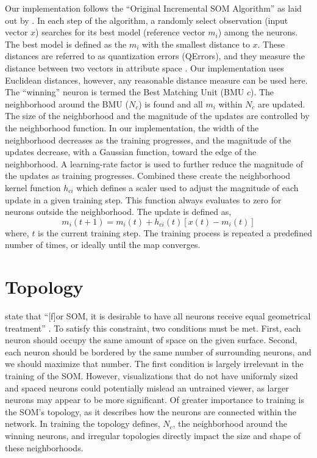 Our implementation follows the ``Original Incremental SOM Algorithm'' as laid
out by \cite{Kohonen2000}.  In each step of the algorithm, a randomly select
observation (input vector $x$) searches for its best model (reference vector
$m_i$) among the neurons.  The best model is defined as the $m_i$ with the
smallest distance to $x$.  These distances are referred to as quantization
errors (QErrors), and they measure the distance between two vectors in
attribute space \citep{Kohonen2000}.  Our implementation uses Euclidean
distances, however, any reasonable distance measure can be used here.  The
``winning'' neuron is termed the Best Matching Unit (BMU $c$).  The
neighborhood around the BMU ($N_c$) is found and all $m_i$ within $N_c$ are
updated.  The size of the neighborhood and the magnitude of the updates are
controlled by the neighborhood function. In our implementation, the width of
the neighborhood decreases as the training progresses, and the magnitude of
the updates decrease, with a Gaussian function, toward the edge of the
neighborhood. A learning-rate factor is used to further reduce the magnitude
of the updates as training progresses.  Combined these create the neighborhood
kernel function $h_{ci}$ which defines a scaler used to adjust the magnitude
of each update in a given training step.  This function always evaluates to
zero for neurons outside the neighborhood.  The update is defined as,
\begin{equation}
  {m_i(t+1)} = m_i(t) +  h_{ci}(t)[x(t) - m_i(t)]
\label{update}
\end{equation}
where, $t$ is the current training step.  The training process is repeated a
predefined number of times, or ideally until the map converges.

\section{Topology}
\citeauthor{wu2006} state that ``[f]or SOM, it is desirable to have all
neurons receive equal geometrical treatment'' \cite[p. 900]{wu2006}.  To
satisfy this constraint, two conditions must be met.  First, each neuron
should occupy the same amount of space on the given surface.  Second, each
neuron should be bordered by the same number of surrounding neurons, and we
should maximize that number.  The first condition is largely irrelevant in the
training of the SOM.  However, visualizations that do not have uniformly sized
and spaced neurons could potentially mislead an untrained viewer, as larger
neurons may appear to be more significant. Of greater importance to
training is the SOM's topology, as it describes how the neurons are connected
within the network.  In training the topology defines, $N_c$, the neighborhood
around the winning neurons, and irregular topologies directly impact the size and
shape of these neighborhoods.  


